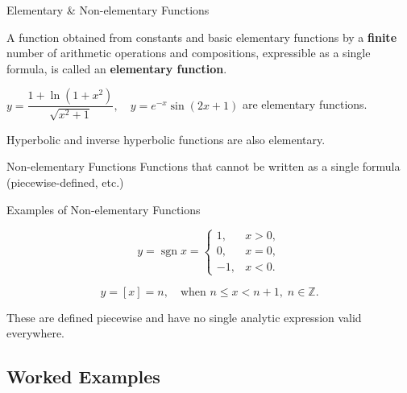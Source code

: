 \documentclass[aspectratio=169,10pt]{beamer}
\begin{document}
\begin{frame}{Elementary \& Non-elementary Functions}
  \begin{definition}
    A function obtained from constants and basic elementary functions by a
    \textbf{finite} number of arithmetic operations and compositions,
    expressible as a single formula, is called an \textbf{elementary function}.
  \end{definition}
  \pause
  \begin{example}
    $y=\dfrac{1+\ln(1+x^2)}{\sqrt{x^2+1}},\quad y=e^{-x}\sin(2x+1)$
    are elementary functions.
  \end{example}
  \pause
  Hyperbolic and inverse hyperbolic functions are also elementary.
  \pause
  \begin{alertblock}{Non-elementary Functions}
    Functions that cannot be written as a single formula (piecewise-defined, etc.)
  \end{alertblock}
\end{frame}

\begin{frame}{Examples of Non-elementary Functions}
  \begin{example}
    \[
      y = \operatorname{sgn}x =
      \begin{cases}
         1, & x>0,\\
         0, & x=0,\\
        -1, & x<0.
      \end{cases}
    \]
  \end{example}
  \pause
  \begin{example}
    \[
      y = [x] = n,\quad\text{when } n\le x < n+1,\; n\in\mathbb{Z}.
    \]
  \end{example}
  \pause
  \vspace{4pt}
  These are defined piecewise and have no single analytic expression valid everywhere.
\end{frame}

\subsection{Worked Examples}
\end{document}
